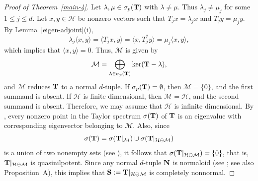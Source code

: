 \documentclass[10pt, a4paper, oneside, reqno]{amsproc}
\numberwithin{equation}{section}
\theoremstyle{remark}
\theoremstyle{definition}
\newcommand*{\Le}{\leqslant}
\begin{document}
\begin{proof}[Proof of Theorem~\ref{main-4}] Let $\lambda, \mu \in \sigma_p({\bf T})$ with $\lambda \neq \mu$. Thus $\lambda_j \neq \mu_j$ for some $1 \Le j \Le d$. Let $x, y \in \mathcal H$ be nonzero vectors such that $T_jx=\lambda_j x$ and $T_jy=\mu_j y$. By Lemma~\ref{eigen-adjoint}(i),  
\begin{equation*}
\lambda_j \langle x, y \rangle= \langle T_j x, y \rangle = \langle x, T^*_j y\rangle = \mu_j \langle x, y \rangle,  
\end{equation*}
which implies that $\langle x, y \rangle=0$. 
Thus, $\mathcal M$ is given by
\begin{equation*}
\mathcal M = \bigoplus_{{\lambda} \in  \sigma_p({\bf T})} \ker({\bf T}- {\lambda}),
\end{equation*}
and $\mathcal M$ reduces ${\bf T}$ to a normal $d$-tuple. If $\sigma_p({\bf T})=\emptyset$, then $\mathcal M = \{0\}$, and the first summand is absent. If $\mathcal H$ is finite dimensional, then $\mathcal M=\mathcal H$, and the second summand is absent. Therefore, we may assume that $\mathcal H$ is infinite dimensional. 
By \cite[Theorem 3.1]{B1996}, every nonzero point in the Taylor spectrum $\sigma({\bf T})$ of ${\bf T}$ is an eigenvalue with corresponding eigenvector belonging to $\mathcal M$. 
Also, since
\begin{equation*}
\sigma({\bf T})=\sigma({\bf T}|_{\mathcal M}) \cup \sigma({\bf T}|_{\mathcal H \ominus \mathcal M})
\end{equation*} 
is a union of two nonempty sets (see \cite[Corollary, p.~185]{T1970}), it follows that $\sigma({\bf T}|_{\mathcal H \ominus \mathcal M})=\{{0}\}$, that is, ${\bf T}|_{\mathcal H \ominus \mathcal M}$ is quasinilpotent. 
Since any normal $d$-tuple ${\bf N}$ is normaloid 
(see \cite[Lemma~3.10]{CS2017}; see also Proposition~A), 
this implies that ${\bf S}:={\bf T}|_{\mathcal H \ominus \mathcal M}$ is completely nonnormal. 
\end{proof}
\end{document}
